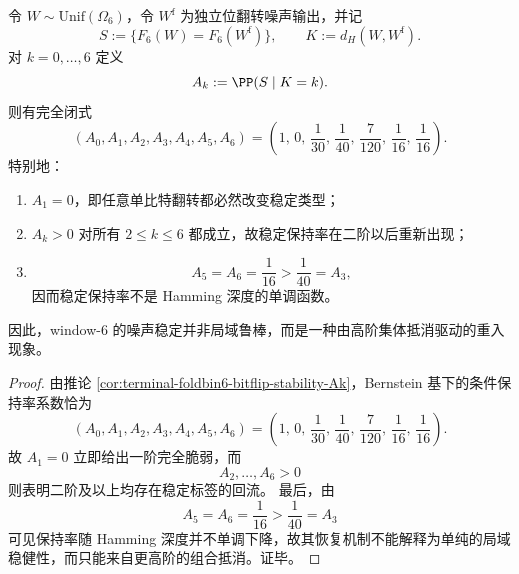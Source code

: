 \begin{theorem}\label{thm:conclusion-window6-noise-local-fragility-high-order-return}
令 \(W\sim \mathrm{Unif}(\Omega_6)\)，令 \(W^{\mathrm f}\) 为独立位翻转噪声输出，并记
\[
S:=\{F_6(W)=F_6(W^{\mathrm f})\},
\qquad
K:=d_H(W,W^{\mathrm f}).
\]
对 \(k=0,\dots,6\) 定义
\[
A_k:=\PP(S\mid K=k).
\]
则有完全闭式
\[
(A_0,A_1,A_2,A_3,A_4,A_5,A_6)
=
\left(
1,\,
0,\,
\frac1{30},\,
\frac1{40},\,
\frac7{120},\,
\frac1{16},\,
\frac1{16}
\right).
\]
特别地：
\begin{enumerate}
\normalfont
  \item \(A_1=0\)，即任意单比特翻转都必然改变稳定类型；
  \item \(A_k>0\) 对所有 \(2\le k\le 6\) 都成立，故稳定保持率在二阶以后重新出现；
  \item
  \[
  A_5=A_6=\frac1{16}>\frac1{40}=A_3,
  \]
  因而稳定保持率不是 Hamming 深度的单调函数。
\end{enumerate}
因此，window-\(6\) 的噪声稳定并非局域鲁棒，而是一种由高阶集体抵消驱动的重入现象。
\end{theorem}
\begin{proof}
由推论 \ref{cor:terminal-foldbin6-bitflip-stability-Ak}，Bernstein 基下的条件保持率系数恰为
\[
(A_0,A_1,A_2,A_3,A_4,A_5,A_6)
=
\left(
1,\,
0,\,
\frac1{30},\,
\frac1{40},\,
\frac7{120},\,
\frac1{16},\,
\frac1{16}
\right).
\]
故 \(A_1=0\) 立即给出一阶完全脆弱，而
\[
A_2,\dots,A_6>0
\]
则表明二阶及以上均存在稳定标签的回流。
最后，由
\[
A_5=A_6=\frac1{16}>\frac1{40}=A_3
\]
可见保持率随 Hamming 深度并不单调下降，故其恢复机制不能解释为单纯的局域稳健性，而只能来自更高阶的组合抵消。证毕。
\end{proof}

